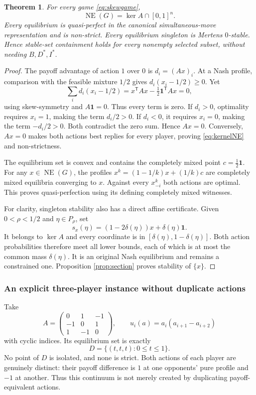 \documentclass[11pt]{article}
\newtheorem{theorem}{Theorem}
\theoremstyle{definition}
\newcommand{\NE}{\operatorname{NE}}
\begin{document}
\begin{theorem}\label{thm:skewgame}
For every game \eqref{eq:skewgame},
\begin{equation}\label{eq:kernelNE}
 \NE(G)=\ker A\cap[0,1]^n.
\end{equation}
Every equilibrium is quasi-perfect in the canonical simultaneous-move
representation and is non-strict. Every equilibrium singleton is Mertens
$0$-stable. Hence stable-set containment holds for every nonempty selected
subset, without needing $B,D^*,I^*$.
\end{theorem}
\begin{proof}
The payoff advantage of action $1$ over $0$ is $d_i=(Ax)_i$.
At a Nash profile, comparison with the feasible mixture $1/2$ gives
$d_i(x_i-1/2)\ge0$. Yet
\[
 \sum_i d_i(x_i-1/2)
 =x^{\mathsf T}Ax-\tfrac12\mathbf1^{\mathsf T}Ax=0,
\]
using skew-symmetry and $A\mathbf1=0$. Thus every term is zero.
If $d_i>0$, optimality requires $x_i=1$, making the term $d_i/2>0$.
If $d_i<0$, it requires $x_i=0$, making the term $-d_i/2>0$.
Both contradict the zero sum. Hence $Ax=0$. Conversely, $Ax=0$ makes both
actions best replies for every player, proving \eqref{eq:kernelNE} and
non-strictness.

The equilibrium set is convex and contains the completely mixed point
$c=\frac12\mathbf1$. For any $x\in\NE(G)$, the profiles
$x^k=(1-1/k)x+(1/k)c$ are completely mixed equilibria converging to $x$.
Against every $x^k_{-i}$ both actions are optimal. This proves quasi-perfection
using its defining completely mixed witnesses.

For clarity, singleton stability also has a direct affine certificate.
Given $0<\rho<1/2$ and $\eta\in P_\rho$, set
\begin{equation}\label{eq:affinesection}
 s_x(\eta)=(1-2\delta(\eta))x+\delta(\eta)\mathbf1.
\end{equation}
It belongs to $\ker A$ and every coordinate is in
$[\delta(\eta),1-\delta(\eta)]$. Both action probabilities therefore meet
all lower bounds, each of which is at most the common mass $\delta(\eta)$.
It is an original Nash equilibrium and remains a constrained one.
Proposition \ref{prop:section} proves stability of $\{x\}$.
\end{proof}

\subsubsection{An explicit three-player instance without duplicate actions}
Take
\[
 A=\begin{pmatrix}0&1&-1\\-1&0&1\\1&-1&0\end{pmatrix},
 \qquad
 u_i(a)=a_i(a_{i+1}-a_{i+2})
\]
with cyclic indices. Its equilibrium set is exactly
\[
 D=\{(t,t,t):0\le t\le1\}.
\]
No point of $D$ is isolated, and none is strict. Both actions of each player
are genuinely distinct: their payoff difference is $1$ at one opponents'
pure profile and $-1$ at another. Thus this continuum is not merely created
by duplicating payoff-equivalent actions.
\end{document}
